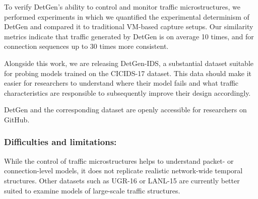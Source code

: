 To verify DetGen's ability to control and monitor traffic microstructures, we performed experiments in which we quantified the experimental determinism of DetGen and compared it to traditional VM-based capture setups. Our similarity metrics indicate that traffic generated by DetGen is on average 10 times, and for connection sequences up to 30 times more consistent.

Alongside this work, we are releasing DetGen-IDS, a substantial dataset suitable for probing models trained on the CICIDS-17 dataset. This data should make it easier for researchers to understand where their model fails and what traffic characteristics are responsible to subsequently improve their design accordingly.

DetGen and the corresponding dataset are openly accessible for researchers on GitHub.




\subsubsection*{Difficulties and limitations:}
While the control of traffic microstructures helps to understand packet- or connection-level models, it does not replicate realistic network-wide temporal structures. Other datasets such as UGR-16 \cite{macia2018ugr} or LANL-15 \cite{turcotte17} are currently better suited to examine models of large-scale traffic structures.

